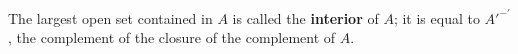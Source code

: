 The largest open set contained in $A$ is called the \textbf{interior} of $A$; it is equal to $A'^{-'}$, the complement of the closure of the complement of $A$.
